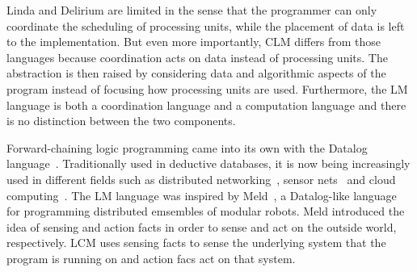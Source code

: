 Linda and Delirium are limited in the sense that the programmer can only
coordinate the scheduling of processing units, while the placement of data is
left to the implementation. But even more importantly, CLM differs from those
languages because coordination acts on data instead of processing units.
The abstraction is then raised by considering data and algorithmic aspects of
the program instead of focusing how processing units are used.
Furthermore, the LM language is both a coordination language and a computation
language and there is no distinction between the two components.

Forward-chaining logic programming came into its own with the Datalog
language~\cite{Ullman:1990:PDK:533142}.  Traditionally used in deductive
databases, it is now being increasingly used in different fields such as
distributed networking~\cite{Loo-condie-garofalakis-p2}, sensor
nets~\cite{Chu:2007:DID:1322263.1322281} and cloud computing~\cite{alvaro:boom}.
The LM language was inspired by Meld~\cite{ashley-rollman-iclp09}, a Datalog-like language for
programming distributed emsembles of modular robots. Meld introduced the idea of
sensing and action facts in order to sense and act on the outside world,
respectively. LCM uses sensing facts to sense the underlying system that the program is running on and action facs
act on that system.
